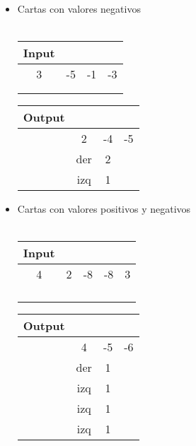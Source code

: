 \documentclass[11pt, a4paper, twoside]{article}
\begin{document}
\begin{enumerate}
\begin{itemize}
      \item Cartas con valores negativos \\ 
      \\
        \begin{minipage}{0.4\textwidth}
            \begin{tabular}{cccc}
               Input \\
                           \hline
                          3 & -5 & -1 & -3 \\
               \\
               \\
            \end{tabular}
        \end{minipage} 
        \begin{minipage}{0.3\textwidth}
            \begin{tabular}{cccc}
              Output \\
                          \hline
                           & 2   & -4  & -5 \\
               & der & 2  & \\
               & izq & 1  & \\
            \end{tabular}
        \end{minipage}
      
            \item Cartas con valores positivos y negativos \\
      \\
        \begin{minipage}{0.4\textwidth}
            \begin{tabular}{ccccc}
               Input\\
                           \hline
               4 & 2 & -8 & -8 & 3 \\
               \\
               \\
               \\
               \\
            \end{tabular}
        \end{minipage} 
        \begin{minipage}{0.3\textwidth}
            \begin{tabular}{cccc}
               Output \\
             \hline 
               & 4   & -5  & -6 \\
               & der & 1  & \\
               & izq & 1  & \\
               & izq & 1  & \\
               & izq & 1  & \\
            \end{tabular}
        \end{minipage}        
        

\end{itemize}
\end{enumerate}
\end{document}
